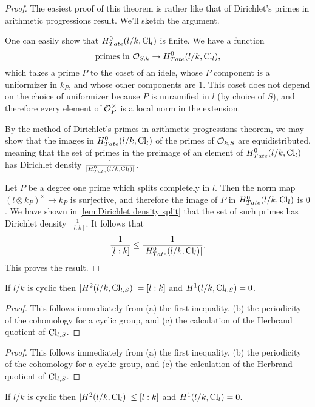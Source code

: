 \begin{proof}
	The easiest proof of this theorem is rather like that of Dirichlet's primes in arithmetic
	progressions result.
	We'll sketch the argument.

	One can easily show that $H^0_{Tate}(l/k, \mathrm{Cl}_{l})$ is finite.
	We have a function
	\[
		\textrm{primes in ${\mathcal O}_{S,k}$} \to H^0_{Tate}(l/k, \mathrm{Cl}_{l}),
	\]
	which takes a prime $P$ to the coset of an idele, whose $P$ component is
	a uniformizer in $k_P$, and whose other components are $1$.
	This coset does not depend on the choice of uniformizer because $P$ is unramified in $l$
	(by choice of $S$), and therefore every element of ${\mathcal O}_P^\times$ is a local norm in the extension.

	By the method of Dirichlet's primes in arithmetic progressions theorem, we may show that
	the images in $H^0_{Tate}(l/k, \mathrm{Cl}_{l})$ of the primes of ${\mathcal O}_{k,S}$ are equidistributed, meaning
	that the set of primes in the preimage of an element of $H^0_{Tate}(l/k, \mathrm{Cl}_{l})$ has
	Dirichlet density $\frac{1}{|H^0_{Tate}(l/k, \mathrm{Cl}_{l})|}$.

	Let $P$ be a degree one prime which splits completely in $l$.
	Then the norm map $(l \otimes k_P)^\times \to k_P$ is surjective,
	and therefore the image of $P$ in $H^0_{Tate}(l/k, \mathrm{Cl}_{l})$ is $0$.
	We have shown in \ref{lem:Dirichlet density split} that the set of such primes has
	Dirichlet density $\frac{1}{[l:k]}$. It follows that
	\[
		\frac{1}{[l:k]} \le \frac{1}{|H^0_{Tate}(l/k, \mathrm{Cl}_{l})|}.
	\]
	This proves the result.
\end{proof}


\begin{corollary}
	If $l/k$ is cyclic then $|H^2(l/k, \mathrm{Cl}_{l,S})| = [l:k]$ and $H^1(l/k, \mathrm{Cl}_{l,S}) = 0$.
\end{corollary}

\begin{proof}
	This follows immediately from (a) the first inequality, (b) the periodicity of
	the cohomology for a cyclic group, and (c) the calculation of the Herbrand quotient
	of $\mathrm{Cl}_{l,S}$.
\end{proof}

\begin{proof}
	This follows immediately from (a) the first inequality, (b) the periodicity of
	the cohomology for a cyclic group, and (c) the calculation of the Herbrand quotient
	of $\mathrm{Cl}_{l,S}$.
\end{proof}

\begin{corollary}
	If $l/k$ is cyclic then $|H^2(l/k, \mathrm{Cl}_{l})| \le [l:k]$ and $H^1(l/k, \mathrm{Cl}_{l}) = 0$.
\end{corollary}

